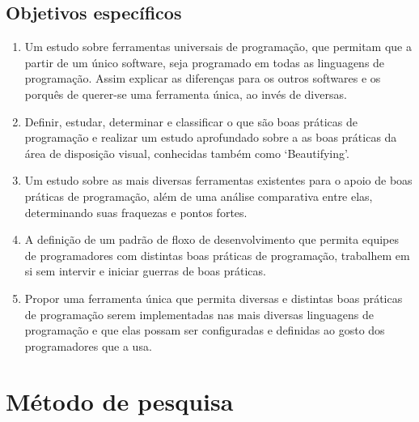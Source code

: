 \subsection{Objetivos específicos}

    \begin{enumerate}

        \item

        Um estudo sobre ferramentas universais de programação, que permitam que
        a partir de um único software, seja programado em todas as linguagens de
        programação. Assim explicar as diferenças para os outros softwares e os
        porquês de querer-se uma ferramenta única, ao invés de diversas.

        \item

        Definir, estudar, determinar e classificar o que são boas práticas de
        programação e realizar um estudo aprofundado sobre a as boas práticas da
        área de disposição visual, conhecidas também como `Beautifying'.

        \item

        Um estudo sobre as mais diversas ferramentas existentes para o apoio de
        boas práticas de programação, além de uma análise comparativa entre
        elas, determinando suas fraquezas e pontos fortes.

        \item

        A definição de um padrão de floxo de desenvolvimento que permita equipes
        de programadores com distintas boas práticas de programação, trabalhem
        em si sem intervir e iniciar guerras de boas práticas.

        \item

        Propor uma ferramenta única que permita diversas e distintas boas
        práticas de programação serem implementadas nas mais diversas linguagens
        de programação e que elas possam ser configuradas e definidas ao gosto
        dos programadores que a usa.

    \end{enumerate}


\section{Método de pesquisa}

